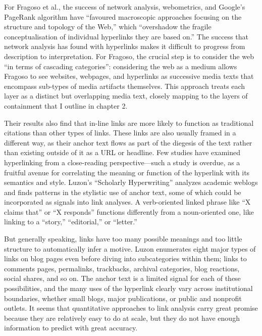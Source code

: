 For Fragoso et al., the success of network analysis, webometrics, and Google's PageRank algorithm have ``favoured macroscopic approaches focusing on the structure and topology of the Web,'' which ``overshadow the fragile conceptualisation of individual hyperlinks they are based on.''\autocite{fragoso_understanding} The success that network analysis has found with hyperlinks makes it difficult to progress from description to interpretation. For Fragoso, the crucial step is to consider the web ``in terms of cascading categories'': considering the web as a medium allows Fragoso to see websites, webpages, and hyperlinks as successive media texts that encompass sub-types of media artifacts themselves.\autocite[193]{fragoso_understanding} This approach treats each layer as a distinct but overlapping media text, closely mapping to the layers of containment that I outline in chapter 2.

Their results also find that in-line links are more likely to function as traditional citations than other types of links. These links are also usually framed in a different way, as their anchor text flows as part of the diegesis of the text rather than existing outside of it as a URL or headline. Few studies have examined hyperlinking from a close-reading perspective---such a study is overdue, as a fruitful avenue for correlating the meaning or function of the hyperlink with its semantics and style. Luzon's ``Scholarly Hyperwriting'' analyzes academic weblogs and finds patterns in the stylistic use of anchor text, some of which could be incorporated as signals into link analyses. A verb-oriented linked phrase like ``X claims that'' or ``X responds'' functions differently from a noun-oriented one, like linking to a ``story,'' ``editorial,'' or ``letter.''\autocite{luzon_scholarly_2009}

But generally speaking, links have too many possible meanings and too little structure to automatically infer a motive. Luzon enumerates eight major types of links on blog pages even before diving into subcategories within them; links to comments pages, permalinks, trackbacks, archival categories, blog reactions, social shares, and so on.\autocite{luzon_scholarly_2009} The anchor text is a limited signal for each of these possibilities, and the many uses of the hyperlink clearly vary across institutional boundaries, whether small blogs, major publications, or public and nonprofit outlets. It seems that quantitative approaches to link analysis carry great promise because they are relatively easy to do at scale, but they do not have enough information to predict with great accuracy.

